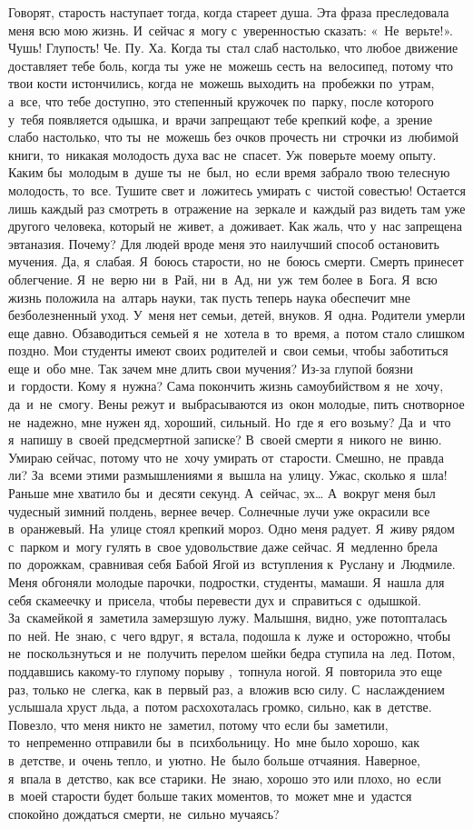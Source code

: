 Говорят, старость наступает тогда, когда стареет душа.
Эта фраза преследовала меня всю мою жизнь.
И~сейчас я~могу с~уверенностью сказать: «~Не~верьте!».
Чушь! Глупость! Че.
Пу.
Ха.
Когда ты~стал слаб настолько, что любое движение доставляет тебе боль, когда ты~уже не~можешь сесть на~велосипед, потому что твои кости истончились, когда не~можешь выходить на~пробежки по~утрам, а~все, что тебе доступно, это степенный кружочек по~парку, после которого у~тебя появляется одышка, и~врачи запрещают тебе крепкий кофе, а~зрение слабо настолько, что ты~не~можешь без очков прочесть ни~строчки из~любимой книги, то~никакая молодость духа вас не~спасет.
Уж~поверьте моему опыту.
Каким бы~молодым в~душе ты~не~был, но~если время забрало твою телесную молодость, то~все.
Тушите свет и~ложитесь умирать с~чистой совестью! Остается лишь каждый раз смотреть в~отражение на~зеркале и~каждый раз видеть там уже другого человека, который не~живет, а~доживает.
Как жаль, что у~нас запрещена эвтаназия.
Почему? Для людей вроде меня это наилучший способ остановить мучения.
Да, я~слабая.
Я~боюсь старости, но~не~боюсь смерти.
Смерть принесет облегчение.
Я~не~верю ни~в~Рай, ни~в~Ад, ни~уж~тем более в~Бога.
Я~всю жизнь положила на~алтарь науки, так пусть теперь наука обеспечит мне безболезненный уход.
У~меня нет семьи, детей, внуков.
Я~одна.
Родители умерли еще давно.
Обзаводиться семьей я~не~хотела в~то~время, а~потом стало слишком поздно.
Мои студенты имеют своих родителей и~свои семьи, чтобы заботиться еще и~обо мне.
Так зачем мне длить свои мучения? Из-за глупой боязни и~гордости.
Кому я~нужна? Сама покончить жизнь самоубийством я~не~хочу, да~и~не~смогу.
Вены режут и~выбрасываются из~окон молодые, пить снотворное не~надежно, мне нужен яд, хороший, сильный.
Но~где я~его возьму? Да~и~что я~напишу в~своей предсмертной записке? В~своей смерти я~никого не~виню.
Умираю сейчас, потому что не~хочу умирать от~старости.
Смешно, не~правда ли? За~всеми этими размышлениями я~вышла на~улицу.
Ужас, сколько я~шла! Раньше мне хватило бы~и~десяти секунд.
А~сейчас, эх… А~вокруг меня был чудесный зимний полдень, вернее вечер.
Солнечные лучи уже окрасили все в~оранжевый.
На~улице стоял крепкий мороз.
Одно меня радует.
Я~живу рядом с~парком и~могу гулять в~свое удовольствие даже сейчас.
Я~медленно брела по~дорожкам, сравнивая себя Бабой Ягой из~вступления к~Руслану и~Людмиле.
Меня обгоняли молодые парочки, подростки, студенты, мамаши.
Я~нашла для себя скамеечку и~присела, чтобы перевести дух и~справиться с~одышкой.
За~скамейкой я~заметила замерзшую лужу.
Малышня, видно, уже потопталась по~ней.
Не~знаю, с~чего вдруг, я~встала, подошла к~луже и~осторожно, чтобы не~поскользнуться и~не~получить перелом шейки бедра ступила на~лед.
Потом, поддавшись какому-то глупому порыву ,~топнула ногой.
Я~повторила это еще раз, только не~слегка, как в~первый раз, а~вложив всю силу.
С~наслаждением услышала хруст льда, а~потом расхохоталась громко, сильно, как в~детстве.
Повезло, что меня никто не~заметил, потому что если бы~заметили, то~непременно отправили бы~в~психбольницу.
Но~мне было хорошо, как в~детстве, и~очень тепло, и~уютно.
Не~было больше отчаяния.
Наверное, я~впала в~детство, как все старики.
Не~знаю, хорошо это или плохо, но~если в~моей старости будет больше таких моментов, то~может мне и~удастся спокойно дождаться смерти, не~сильно мучаясь?
 
